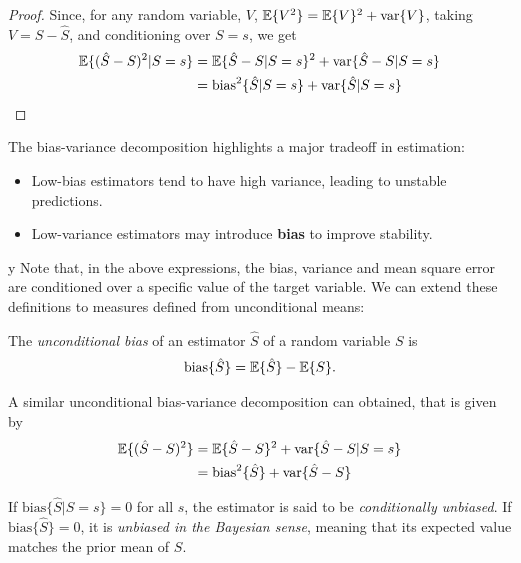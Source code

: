 \begin{proof}

Since, for any random variable, $V$, $\mathbb{E}\{V^2\} = \mathbb{E}\{V\}^2 + {\rm var}\{V\}$, taking $V=S-\hat{S}$, and conditioning over $S=s$, we get
\begin{align}
\mathbb{E}\{(\hat{S}-S)^2|S=s\} 
	&= \mathbb{E}\{\hat{S}-S|S=s\}^2 + {\rm var}\{\hat{S}-S|S=s\}   \nonumber\\
	&= {\rm bias}^2\{\hat{S} | S=s\} + {\rm var}\{\hat{S}|S=s\} 
\end{align}
\end{proof}

The bias-variance decomposition highlights a major tradeoff in estimation:
\begin{itemize}
\item Low-bias estimators tend to have high variance, leading to unstable predictions.
\item Low-variance estimators may introduce \textbf{bias} to improve stability.
\end{itemize}
y
Note that, in the above expressions, the bias, variance and mean square error are conditioned over a specific value of the target variable. We can extend these definitions to measures defined from unconditional means:

\begin{definition}
The \textit{unconditional bias} of an estimator $\hat{S}$ of a random variable $S$ is
\begin{align}
\text{bias}\{\hat{S}\} = \mathbb{E}\{\hat{S}\} - \mathbb{E}\{S\}.
\end{align}
\end{definition}

A similar unconditional bias-variance decomposition can obtained, that is given by
\begin{align}
\mathbb{E}\{(\hat{S}-S)^2\} 
	&= \mathbb{E}\{\hat{S}-S\}^2 + {\rm var}\{\hat{S}-S|S=s\}   \nonumber\\
	&= {\rm bias}^2\{\hat{S}\} + {\rm var}\{\hat{S}-S\} 
\end{align}

If $\text{bias}\{\hat{S} | S = s\} = 0$ for all $s$, the estimator is said to be \textit{conditionally unbiased}. If $\text{bias}\{\hat{S}\} = 0$, it is \textit{unbiased in the Bayesian sense}, meaning that its expected value matches the prior mean of $S$.


